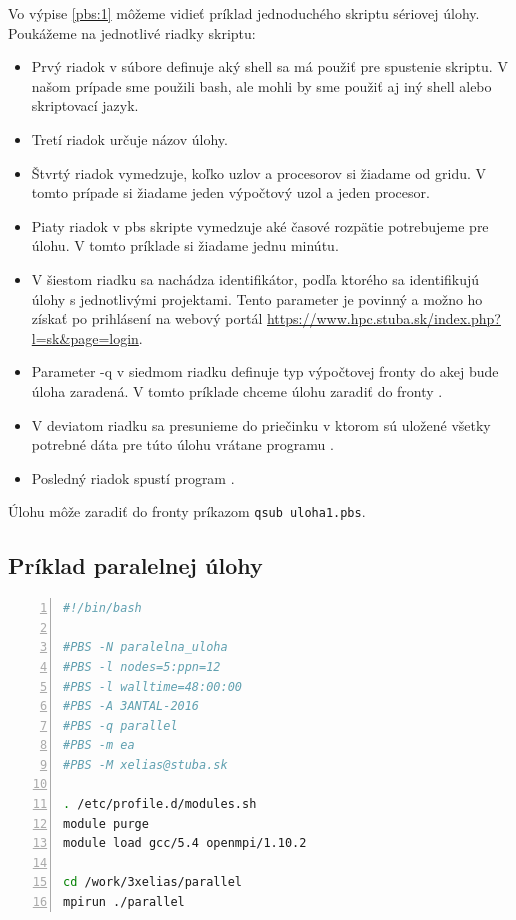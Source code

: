 Vo výpise \ref{pbs:1} môžeme vidieť príklad jednoduchého skriptu sériovej úlohy.
Poukážeme na jednotlivé riadky skriptu:
\begin{itemize}
\item
  Prvý riadok v súbore definuje aký shell sa má použiť pre spustenie skriptu.
  V našom prípade sme použili \acrshort{bash}, ale mohli by sme použiť aj iný shell alebo skriptovací jazyk.
\item
  Tretí riadok určuje názov úlohy.
\item
  Štvrtý riadok vymedzuje, koľko uzlov a procesorov si žiadame od gridu.
  V tomto prípade si žiadame jeden výpočtový uzol a jeden procesor.
\item
  Piaty riadok v \acrshort{pbs} skripte vymedzuje aké časové rozpätie potrebujeme pre úlohu.
  V tomto príklade si žiadame jednu minútu.
\item
  V šiestom riadku sa nachádza identifikátor, podľa ktorého sa identifikujú úlohy s jednotlivými projektami.
  Tento parameter je povinný a možno ho získať po prihlásení na webový portál \url{https://www.hpc.stuba.sk/index.php?l=sk&page=login}.
\item
  Parameter -q v siedmom riadku definuje typ výpočtovej fronty do akej bude úloha zaradená.
  V tomto príklade chceme úlohu zaradiť do fronty .
\item
  V deviatom riadku sa presunieme do priečinku v ktorom sú uložené všetky potrebné dáta pre túto úlohu vrátane programu .
\item
  Posledný riadok spustí program .
\end{itemize}
Úlohu môže zaradiť do fronty príkazom \texttt{qsub uloha1.pbs}.

\subsection{Príklad paralelnej úlohy}
\begin{lstlisting}[language=bash, caption={uloha2.pbs}, label={pbs:2}, numbers=left]
#!/bin/bash

#PBS -N paralelna_uloha
#PBS -l nodes=5:ppn=12
#PBS -l walltime=48:00:00  
#PBS -A 3ANTAL-2016
#PBS -q parallel
#PBS -m ea
#PBS -M xelias@stuba.sk

. /etc/profile.d/modules.sh
module purge
module load gcc/5.4 openmpi/1.10.2

cd /work/3xelias/parallel
mpirun ./parallel
\end{lstlisting}

